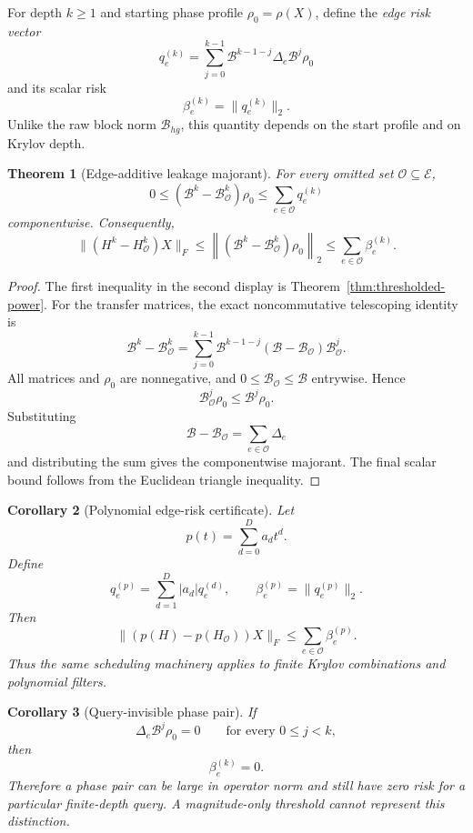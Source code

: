 \documentclass[11pt]{article}
\newtheorem{theorem}{Theorem}[section]
\newtheorem{corollary}[theorem]{Corollary}
\theoremstyle{definition}
\theoremstyle{remark}
\begin{document}
For depth $k\ge1$ and starting phase profile $\rho_0=\rho(X)$, define the
\emph{edge risk vector}
\[
\boxed{
q_e^{(k)}
=
\sum_{j=0}^{k-1}
\mathcal B^{k-1-j}\Delta_e\mathcal B^j\rho_0
}
\]
and its scalar risk
\[
\boxed{
\beta_e^{(k)}=\lVert q_e^{(k)}\rVert_2.
}
\]
Unlike the raw block norm $\mathcal B_{hg}$, this quantity depends on the
start profile and on Krylov depth.

\begin{theorem}[Edge-additive leakage majorant]
\label{thm:edge-additive-majorant}
For every omitted set $\mathcal O\subseteq\mathcal E$,
\[
\boxed{
0\le
(\mathcal B^k-\mathcal B_{\mathcal O}^k)\rho_0
\le
\sum_{e\in\mathcal O}q_e^{(k)}
}
\]
componentwise.  Consequently,
\[
\boxed{
\lVert(H^k-H_{\mathcal O}^k)X\rVert_F
\le
\left\lVert
(\mathcal B^k-\mathcal B_{\mathcal O}^k)\rho_0
\right\rVert_2
\le
\sum_{e\in\mathcal O}\beta_e^{(k)}.
}
\]
\end{theorem}

\begin{proof}
The first inequality in the second display is
Theorem~\ref{thm:thresholded-power}.  For the transfer matrices, the exact
noncommutative telescoping identity is
\[
\mathcal B^k-\mathcal B_{\mathcal O}^k
=
\sum_{j=0}^{k-1}
\mathcal B^{k-1-j}
(\mathcal B-\mathcal B_{\mathcal O})
\mathcal B_{\mathcal O}^j.
\]
All matrices and $\rho_0$ are nonnegative, and
$0\le\mathcal B_{\mathcal O}\le\mathcal B$ entrywise.  Hence
\[
\mathcal B_{\mathcal O}^j\rho_0
\le
\mathcal B^j\rho_0.
\]
Substituting
\[
\mathcal B-\mathcal B_{\mathcal O}
=
\sum_{e\in\mathcal O}\Delta_e
\]
and distributing the sum gives the componentwise majorant.  The final scalar
bound follows from the Euclidean triangle inequality.
\end{proof}

\begin{corollary}[Polynomial edge-risk certificate]\label{claim:final-16-2}
Let
\[
p(t)=\sum_{d=0}^{D}a_dt^d.
\]
Define
\[
q_e^{(p)}
=
\sum_{d=1}^{D}|a_d|q_e^{(d)},
\qquad
\beta_e^{(p)}=\lVert q_e^{(p)}\rVert_2.
\]
Then
\[
\boxed{
\lVert(p(H)-p(H_{\mathcal O}))X\rVert_F
\le
\sum_{e\in\mathcal O}\beta_e^{(p)}.
}
\]
Thus the same scheduling machinery applies to finite Krylov combinations and
polynomial filters.
\end{corollary}

\begin{corollary}[Query-invisible phase pair]\label{claim:final-16-3}
If
\[
\Delta_e\mathcal B^j\rho_0=0
\qquad
\text{for every }0\le j<k,
\]
then
\[
\beta_e^{(k)}=0.
\]
Therefore a phase pair can be large in operator norm and still have zero
risk for a particular finite-depth query.  A magnitude-only threshold cannot
represent this distinction.
\end{corollary}
\end{document}
